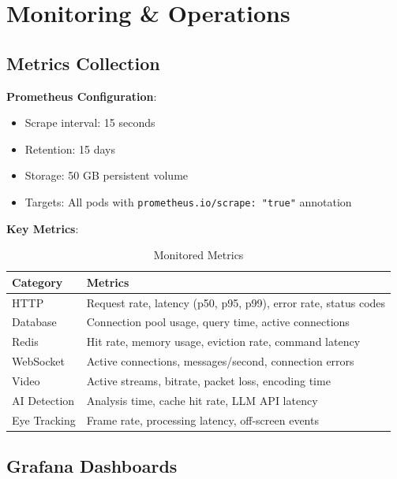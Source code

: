 \documentclass[11pt,letterpaper]{article}
\begin{document}

\section{Monitoring \& Operations}

\subsection{Metrics Collection}

\textbf{Prometheus Configuration}:
\begin{itemize}[noitemsep]
    \item Scrape interval: 15 seconds
    \item Retention: 15 days
    \item Storage: 50 GB persistent volume
    \item Targets: All pods with \texttt{prometheus.io/scrape: "true"} annotation
\end{itemize}

\textbf{Key Metrics}:
\begin{table}[H]
\centering
\small
\begin{tabularx}{\textwidth}{lX}
\toprule
\textbf{Category} & \textbf{Metrics} \\
\midrule
HTTP & Request rate, latency (p50, p95, p99), error rate, status codes \\
Database & Connection pool usage, query time, active connections \\
Redis & Hit rate, memory usage, eviction rate, command latency \\
WebSocket & Active connections, messages/second, connection errors \\
Video & Active streams, bitrate, packet loss, encoding time \\
AI Detection & Analysis time, cache hit rate, LLM API latency \\
Eye Tracking & Frame rate, processing latency, off-screen events \\
\bottomrule
\end{tabularx}
\caption{Monitored Metrics}
\end{table}

\subsection{Grafana Dashboards}
\end{document}
